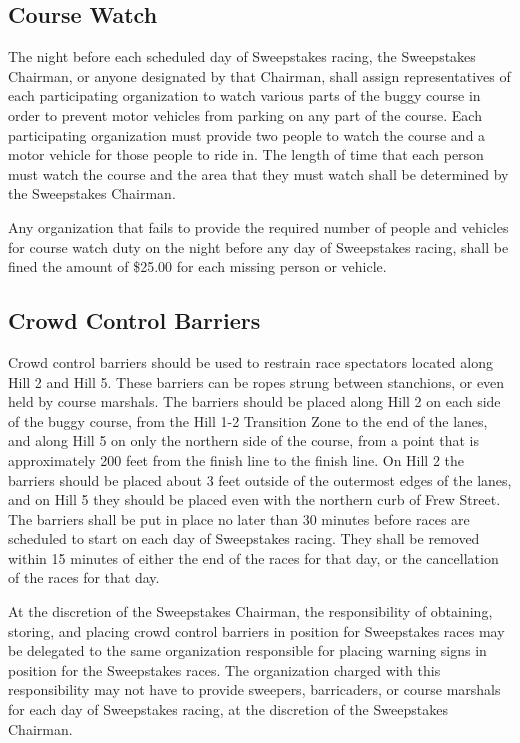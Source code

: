 \subsection{Course Watch}

	The night before each scheduled day of Sweepstakes racing, the Sweepstakes
	Chairman, or anyone designated by that Chairman, shall assign representatives
	of each participating organization to watch various parts of the buggy course
	in order to prevent motor vehicles from parking on any part of the course. Each
	participating organization must provide two people to watch the course and a
	motor vehicle for those people to ride in. The length of time that each person
	must watch the course and the area that they must watch shall be determined by
	the Sweepstakes Chairman.

	Any organization that fails to provide the required number of people and
	vehicles for course watch duty on the night before any day of Sweepstakes
	racing, shall be fined the amount of \$25.00 for each missing person or
	vehicle.

\subsection{Crowd Control Barriers}

	Crowd control barriers should be used to restrain race spectators located along
	Hill 2 and Hill 5. These barriers can be ropes strung between stanchions, or
	even held by course marshals. The barriers should be placed along Hill 2 on
	each side of the buggy course, from the Hill 1-2 Transition Zone to the end of
	the lanes, and along Hill 5 on only the northern side of the course, from a
	point that is approximately 200 feet from the finish line to the finish line.
	On Hill 2 the barriers should be placed about 3 feet outside of the outermost
	edges of the lanes, and on Hill 5 they should be placed even with the northern
	curb of Frew Street. The barriers shall be put in place no later than 30
	minutes before races are scheduled to start on each day of Sweepstakes racing.
	They shall be removed within 15 minutes of either the end of the races for that
	day, or the cancellation of the races for that day.

	At the discretion of the Sweepstakes Chairman, the responsibility of obtaining,
	storing, and placing crowd control barriers in position for Sweepstakes races
	may be delegated to the same organization responsible for placing warning signs
	in position for the Sweepstakes races. The organization charged with this
	responsibility may not have to provide sweepers, barricaders, or course marshals
	for each day of Sweepstakes racing, at the discretion of the Sweepstakes
	Chairman.

